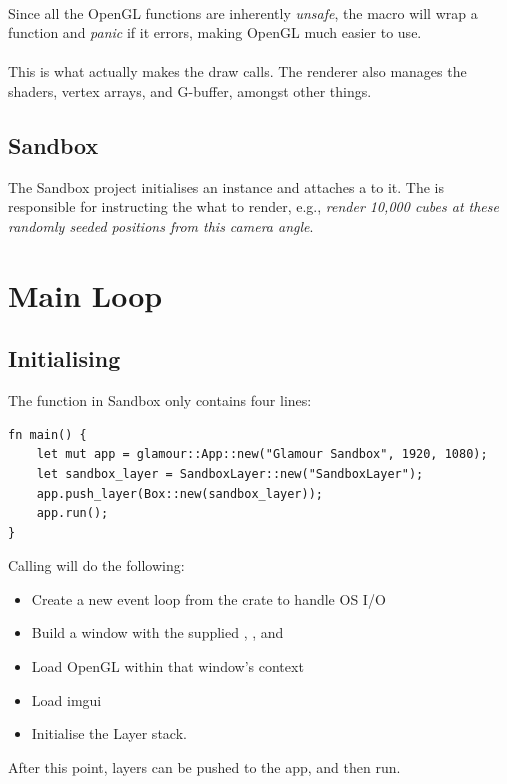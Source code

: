 \begin{multicols}{2}
  \paragraph{}
  Since all the OpenGL functions are inherently \emph{unsafe}, the  macro will wrap a function and \emph{panic} if it errors, making OpenGL much easier to use.

  \paragraph{}
  This is what actually makes the draw calls.
  The renderer also manages the shaders, vertex arrays, and G-buffer, amongst other things.

  \subsection{Sandbox}
  The Sandbox project initialises an  instance and attaches a  to it.
  The  is responsible for instructing the  what to render, e.g., \emph{render 10,000 cubes at these randomly seeded positions from this camera angle}.

\end{multicols}

\section{Main Loop}\label{main-loop}

\subsection{Initialising}
The  function in Sandbox only contains four lines:
\begin{verbatim}
fn main() {
    let mut app = glamour::App::new("Glamour Sandbox", 1920, 1080);
    let sandbox_layer = SandboxLayer::new("SandboxLayer");
    app.push_layer(Box::new(sandbox_layer));
    app.run();
}
\end{verbatim}
Calling  will do the following:
\begin{itemize}
  \item Create a new event loop from the  crate to handle OS I/O
  \item Build a window with the supplied , , and 
  \item Load OpenGL within that window's context
  \item Load imgui
  \item Initialise the Layer stack.
\end{itemize}
After this point, layers can be pushed to the app, and then run.

